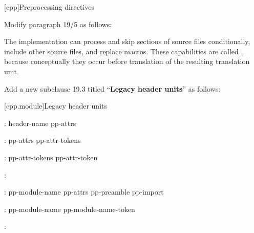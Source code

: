 \setcounter{chapter}{18}
[cpp]{Preprocessing directives}%

\begin{after}
Modify paragraph 19/5 as follows:

\begin{std.txt}
\resetalinea[4]
\alinea
The implementation can
process and skip sections of source files conditionally,
include other source files,
and replace macros.
These capabilities are called
,
because conceptually they occur
before translation of the resulting translation unit.
\end{std.txt}

\noindent
Add a new subclause 19.3 titled ``\textbf{Legacy header units}'' as follows:

\setcounter{section}{2}
[cpp.module]{Legacy header units}%
\resetalinea[0]

\begin{std.txt}
\color{addclr}
\begin{bnf}
:\br
  \opt{} \opt{} header-name pp-attrs\opt{} \terminal{;}
\end{bnf}

\begin{bnf}
:\br
  pp-attrs\opt{} \terminal{[} \terminal{[} pp-attr-tokens \terminal{]} \terminal{]}
\end{bnf}

\begin{bnf}
:\br
  pp-attr-tokens\opt{} pp-attr-token
\end{bnf}

\begin{bnf}
:\br
\end{bnf}

\begin{bnf}
:\br
  \opt{} pp-module-name pp-attrs\opt{} \terminal{;}
  pp-preamble pp-import
\end{bnf}

\begin{bnf}
:\br
  pp-module-name\opt{} pp-module-name-token
\end{bnf}

\begin{bnf}
:\br
  \descr{any \grammarterm{preprocessing-token} other than \terminal{[} or \terminal{;}}
\end{bnf}


\end{std.txt}
\end{after}
